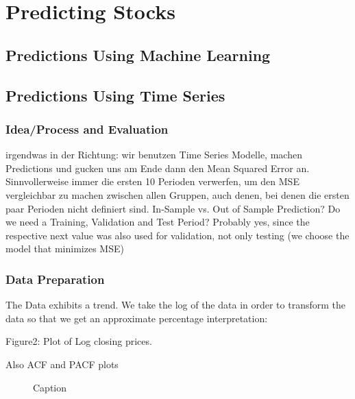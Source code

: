 \chapter{Predicting Stocks}\label{ch:predictions}


\section{Predictions Using Machine Learning}

\section{Predictions Using Time Series}
\subsection{Idea/Process and Evaluation}
irgendwas in der Richtung: wir benutzen Time Series Modelle, machen Predictions und gucken uns am Ende dann den Mean Squared Error an. Sinnvollerweise immer die ersten 10 Perioden verwerfen, um den MSE vergleichbar zu machen zwischen allen Gruppen, auch denen, bei denen die ersten paar Perioden nicht definiert sind. 	
In-Sample vs. Out of Sample Prediction?
Do we need a Training, Validation and Test Period? Probably yes, since the respective next value was also used for validation, not only testing (we choose the model that minimizes MSE)

\subsection{Data Preparation}

The Data exhibits a trend. We take the log of the data in order to transform the data so that we get an approximate percentage interpretation:

Figure2: Plot of Log closing prices.
%

Also ACF and PACF plots
\begin{figure}[h]
    \centering
    \begin{adjustbox}{width=.9\textwidth,center}
    
    \end{adjustbox}  
    \caption{Caption}
    \label{fig:Daily Stock Prices for all Stocks in the Data Set}
\end{figure}{}







